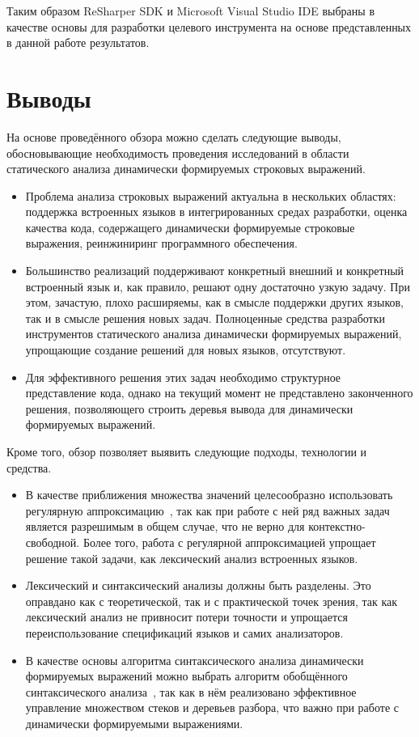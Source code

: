 Таким образом ReSharper SDK и Microsoft Visual Studio IDE выбраны в качестве основы для разработки целевого инструмента на основе представленных в данной работе результатов.

\section{Выводы}

На основе проведённого обзора можно сделать следующие выводы, обосновывающие необходимость проведения исследований в области статического анализа динамически формируемых строковых выражений.

\begin{itemize}
    \item Проблема анализа строковых выражений актуальна в нескольких областях: поддержка встроенных языков в интегрированных средах разработки, оценка качества кода, содержащего динамически формируемые строковые выражения, реинжиниринг программного обеспечения.
    \item Большинство реализаций поддерживают конкретный внешний и конкретный встроенный язык и, как правило, решают одну достаточно узкую задачу. При этом, зачастую, плохо расширяемы, как в смысле поддержки других языков, так и в смысле решения новых задач. Полноценные средства разработки инструментов статического анализа динамически формируемых выражений, упрощающие создание решений для новых языков, отсутствуют.
    \item Для эффективного решения этих задач необходимо структурное представление кода, однако на текущий момент не представлено законченного решения, позволяющего строить деревья вывода для динамически формируемых выражений.
\end{itemize}

Кроме того, обзор позволяет выявить следующие подходы, технологии и средства.

\begin{itemize}
    \item В качестве приближения множества значений целесообразно использовать регулярную аппроксимацию~\cite{JSA, RegOverApprox}, так как при работе с ней ряд важных задач является разрешимым в общем случае, что не верно для контекстно-свободной. Более того, работа с регулярной аппроксимацией упрощает решение такой задачи, как лексический анализ встроенных языков.
    \item Лексический и синтаксический анализы должны быть разделены. Это оправдано как с теоретической, так и с практической точек зрения, так как лексический анализ не привносит потери точности и упрощается переиспользование спецификаций языков и самих анализаторов. 
    \item В качестве основы алгоритма синтаксического анализа динамически формируемых выражений можно выбрать алгоритм обобщённого синтаксического анализа~\cite{GeneralisedlrBIG}, так как в нём реализовано эффективное управление множеством стеков и деревьев разбора, что важно при работе с динамически формируемыми выражениями.
\end{itemize}
\clearpage
